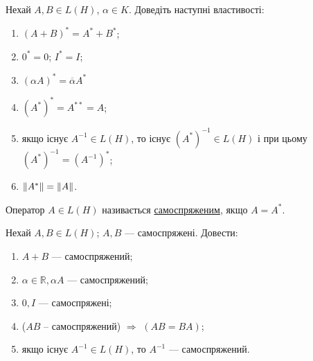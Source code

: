 \begin{exercise}
    Нехай $A, B \in L(H)$, $\alpha \in K$. Доведіть наступні властивості:
    \begin{enumerate}[label=\ukr*)]
        \item $(A+B)^* = A^* + B^*$;
        \item $0^*=0$; $I^* = I$;
        \item $(\alpha A)^* = \overline{\alpha}A^*$
        \item $(A^*)^* = A^{**} = A$;
        \item якщо існує $A^{-1} \in L(H)$, то існує $(A^*)^{-1} \in 
        L(H)$ і при цьому $(A^*)^{-1} = (A^{-1})^*$;
        \item $\left\lVert A^*\right\rVert = \left\lVert A\right\rVert$.
    \end{enumerate}
\end{exercise}

\begin{theory}
    Оператор $A \in L(H)$ називається \uline{самоспряженим}, якщо 
    $A = A^*$.
\end{theory}

\begin{exercise}
    Нехай $A, B \in L(H)$; $A, B$ --- самоспряжені. Довести:
    \begin{enumerate}[label=\ukr*)]
        \item $A+B$ --- самоспряжений;
        \item $\alpha \in \mathbb{R}, \alpha A $ 
        --- самоспряжений;
        \item $0, I$ --- самоспряжені;
        \item ($AB$ -- самоспряжений) $\Rightarrow$ $(AB = BA)$;
        \item якщо існує $A^{-1} \in L(H)$, то $A^{-1}$ --- 
        самоспряжений.
    \end{enumerate}
\end{exercise}

